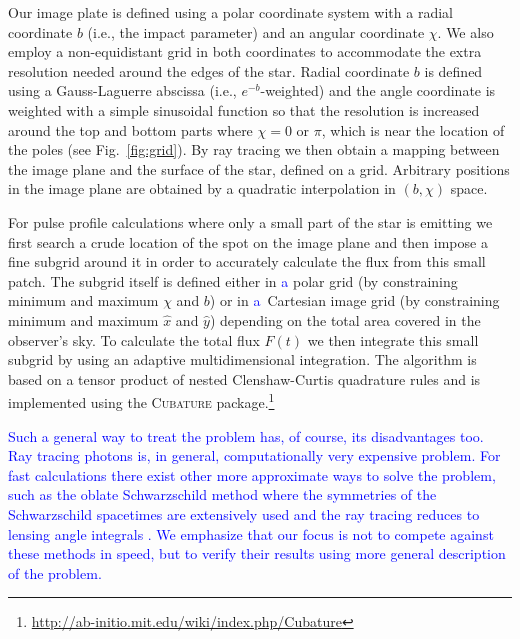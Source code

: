 \documentclass{aa}
\newcommand{\refe}[1]{\textcolor{blue}{{#1}}}
\newcommand{\sch}{Schwarzschild }
\begin{document}
Our image plate is defined using a polar coordinate system with a radial
coordinate $b$ (i.e., the impact parameter) and an angular coordinate $\chi$.
We also employ a non-equidistant grid in both coordinates to accommodate
the extra resolution needed around the edges of the star.  Radial
coordinate $b$ is defined using a Gauss-Laguerre abscissa (i.e.,
$e^{-b}$-weighted) and the angle coordinate is weighted with a simple
sinusoidal function so that the resolution is increased around the top
and bottom parts where $\chi = 0$ or $\pi$, which is near the location of the poles
(see Fig.~\ref{fig:grid}).  By ray tracing we then obtain
a mapping between the image plane and the surface of the star, defined
on a grid.
Arbitrary positions in the image plane are obtained by a quadratic interpolation in $(b, \chi)$ space.

For pulse profile calculations where only a small part of the star is
emitting we first search a crude location of the spot on the image plane
and then impose a fine subgrid around it in order to accurately
calculate the flux from this small patch.  The subgrid itself is defined
either in \refe{a} polar grid (by constraining minimum and maximum $\chi$ and
$b$) or in \refe{a} Cartesian image grid (by constraining minimum and maximum
$\hat{x}$ and $\hat{y}$) depending on the total area covered in the observer's sky.  To
calculate the total flux $F(t)$ we then integrate this small subgrid by
using an adaptive multidimensional integration.  
The algorithm is based on a tensor product of nested Clenshaw-Curtis quadrature rules and is implemented using the \textsc{Cubature} package.\footnote{
\url{http://ab-initio.mit.edu/wiki/index.php/Cubature}}

\refe{
Such a general way to treat the problem has, of course, its disadvantages too.
Ray tracing photons is, in general, computationally very expensive problem.
For fast calculations there exist other more approximate ways to solve the problem, such as the oblate \sch method where the symmetries of the \sch spacetimes are extensively used and the ray tracing reduces to lensing angle integrals \citep[see e.g.][]{PB06, MLC07}.
We emphasize that our focus is not to compete against these methods in speed, but to verify their results using more general description of the problem.
}
\end{document}

